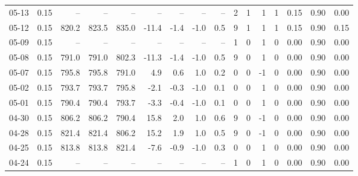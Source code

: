\begin{threeparttable}
{\begin{tabular}{lrrrrrrrrrrrrrrr}
  05-13 &     0.15 &    -- &    -- &    -- &         -- &             -- &                       -- &                  -- &              2 &         1 &     1 &         1 &       0.15 &      0.90 &           0.00 \\
  05-12 &     0.15 & 820.2 & 823.5 & 835.0 &      -11.4 &           -1.4 &                     -1.0 &                 0.5 &              9 &         1 &     1 &         1 &       0.15 &      0.90 &           0.15 \\
  05-09 &     0.15 &    -- &    -- &    -- &         -- &             -- &                       -- &                  -- &              1 &         0 &     1 &         0 &       0.00 &      0.90 &           0.00 \\
  05-08 &     0.15 & 791.0 & 791.0 & 802.3 &      -11.3 &           -1.4 &                     -1.0 &                 0.5 &              9 &         0 &     1 &         0 &       0.00 &      0.90 &           0.00 \\
  05-07 &     0.15 & 795.8 & 795.8 & 791.0 &        4.9 &            0.6 &                      1.0 &                 0.2 &              0 &         0 &    -1 &         0 &       0.00 &      0.90 &           0.00 \\
  05-02 &     0.15 & 793.7 & 793.7 & 795.8 &       -2.1 &           -0.3 &                     -1.0 &                 0.1 &              0 &         0 &     1 &         0 &       0.00 &      0.90 &           0.00 \\
  05-01 &     0.15 & 790.4 & 790.4 & 793.7 &       -3.3 &           -0.4 &                     -1.0 &                 0.1 &              0 &         0 &     1 &         0 &       0.00 &      0.90 &           0.00 \\
  04-30 &     0.15 & 806.2 & 806.2 & 790.4 &       15.8 &            2.0 &                      1.0 &                 0.6 &              9 &         0 &    -1 &         0 &       0.00 &      0.90 &           0.00 \\
  04-28 &     0.15 & 821.4 & 821.4 & 806.2 &       15.2 &            1.9 &                      1.0 &                 0.5 &              9 &         0 &    -1 &         0 &       0.00 &      0.90 &           0.00 \\
  04-25 &     0.15 & 813.8 & 813.8 & 821.4 &       -7.6 &           -0.9 &                     -1.0 &                 0.3 &              0 &         0 &     1 &         0 &       0.00 &      0.90 &           0.00 \\
  04-24 &     0.15 &    -- &    -- &    -- &         -- &             -- &                       -- &                  -- &              1 &         0 &     1 &         0 &       0.00 &      0.90 &           0.00 \\

\end{tabular}}
\end{threeparttable}
